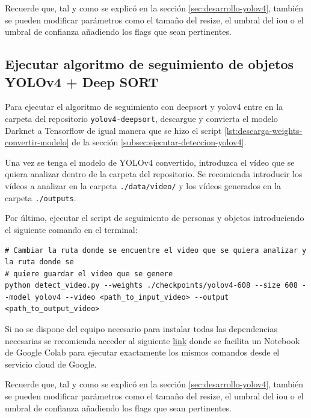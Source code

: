 Recuerde que, tal y como se explicó en la sección \ref{sec:desarrollo-yolov4}, también se pueden modificar parámetros como el tamaño del resize, el umbral del \gls{iou} o el umbral de confianza añadiendo los flags que sean pertinentes.

\subsection{Ejecutar algoritmo de seguimiento de objetos YOLOv4 + Deep SORT}
\label{subsec:ejecutar-seguimiento-yolov4-deepsort}

Para ejecutar el algoritmo de seguimiento con \gls{deepsort} y \gls{yolov4} entre en la carpeta del repositorio \texttt{yolov4-deepsort}, descargue y convierta el modelo Darknet a Tensorflow de igual manera que se hizo el script \ref{lst:descarga-weights-convertir-modelo} de la sección \ref{subsec:ejecutar-deteccion-yolov4}.

Una vez se tenga el modelo de YOLOv4 convertido, introduzca el vídeo que se quiera analizar dentro de la carpeta del repositorio. Se recomienda introducir los vídeos a analizar en la carpeta \texttt{./data/video/} y los vídeos generados en la carpeta \texttt{./outputs}.

Por último, ejecutar el script de seguimiento de personas y objetos introduciendo el siguiente comando en el terminal:

\vspace{0.5cm}
\begin{lstlisting}[language=iPython,caption=Ejecutar script seguimiento de personas y objetos con DeepSORT,captionpos=b,label={lst:ejecutar-yolov4-deepsort}]
# Cambiar la ruta donde se encuentre el video que se quiera analizar y la ruta donde se
# quiere guardar el video que se genere
python detect_video.py --weights ./checkpoints/yolov4-608 --size 608 --model yolov4 --video <path_to_input_video> --output <path_to_output_video>
\end{lstlisting}

Si no se dispone del equipo necesario para instalar todas las dependencias necesarias se recomienda acceder al siguiente \href{https://colab.research.google.com/drive/18vL9LH8e9VaimA9LzBD35Cn4AOm6C17I?usp=sharing}{link} donde se facilita un Notebook de Google Colab para ejecutar exactamente los mismos comandos desde el servicio cloud de Google.

Recuerde que, tal y como se explicó en la sección \ref{sec:desarrollo-yolov4}, también se pueden modificar parámetros como el tamaño del resize, el umbral del \gls{iou} o el umbral de confianza añadiendo los flags que sean pertinentes.


